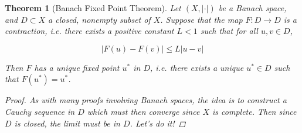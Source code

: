 \documentclass{article}
\newtheorem{theorem}{Theorem}[section]
\begin{document}
\begin{theorem}[Banach Fixed Point Theorem] Let $(X, |\cdot|)$ be a Banach space, and $D \subset X$ a closed, nonempty subset of $X$. Suppose that the map $F: D \rightarrow D$ is a contraction, i.e. there exists a positive constant $L < 1$ such that for all $u, v \in D$,

\[
|F(u) - F(v)| \leq L|u - v|
\]

Then $F$ has a unique fixed point $u^*$ in $D$, i.e. there exists a unique $u^* \in D$ such that $F(u^*) = u^*$.

\begin{proof}
As with many proofs involving Banach spaces, the idea is to construct a Cauchy sequence in $D$ which must then converge since $X$ is complete. Then since $D$ is closed, the limit must be in $D$. Let's do it!


\end{proof}
\end{theorem}
\end{document}
